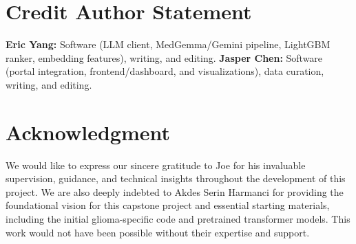 \documentclass[conference]{IEEEtran}
\begin{document}
\section{Credit Author Statement}
\textbf{Eric Yang:} Software (LLM client, MedGemma/Gemini pipeline, LightGBM ranker, embedding features), writing, and editing. \textbf{Jasper Chen:} Software (portal integration, frontend/dashboard, and visualizations), data curation, writing, and editing.

\section{Acknowledgment}
We would like to express our sincere gratitude to Joe for his invaluable supervision, guidance, and technical insights throughout the development of this project. We are also deeply indebted to Akdes Serin Harmanci for providing the foundational vision for this capstone project and essential starting materials, including the initial glioma-specific code and pretrained transformer models. This work would not have been possible without their expertise and support.



\vspace{12pt}
\end{document}
